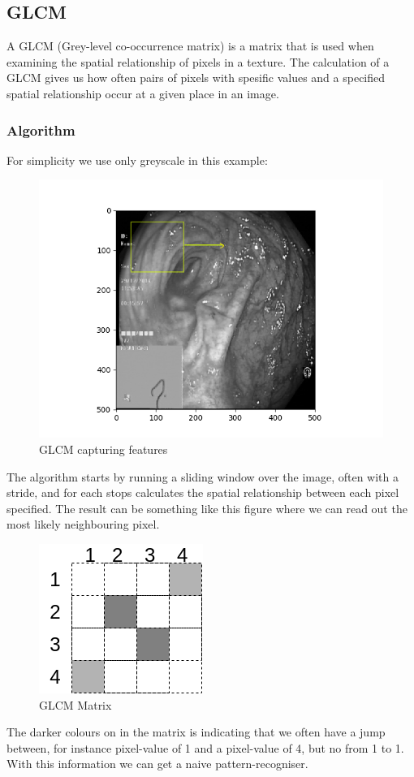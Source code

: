 	  
	  
	  \subsection{GLCM}
	    A GLCM (Grey-level co-occurrence matrix) is a matrix that is used when examining the spatial relationship of pixels in a texture. 
	    The calculation of a GLCM gives us how often pairs of pixels with spesific values and a specified spatial relationship occur at a given place in an image. %
	  
	    \subsubsection{Algorithm}
	      For simplicity we use only greyscale in this example:
	      \begin{figure}[ht]
		\centering
		\includegraphics[scale=0.5]{figures/sliding_window_box.png}
		\caption{GLCM capturing features}
	      \end{figure}
	      The algorithm starts by running a sliding window over the image, often with a stride, and for each stops calculates the spatial relationship between each pixel specified.
	      The result can be something like this figure %
	      where we can read out the most likely neighbouring pixel.
	       \begin{figure}[ht]
		\centering
		\includegraphics[scale=0.5]{figures/Simple_GLCM.png}
		\caption{GLCM Matrix}
	      \end{figure}
	      The darker colours on in the matrix is indicating that we often have a jump between, for instance pixel-value of 1 and a pixel-value of 4, but no from 1 to 1.\\
	      With this information we can get a naive pattern-recogniser. 
